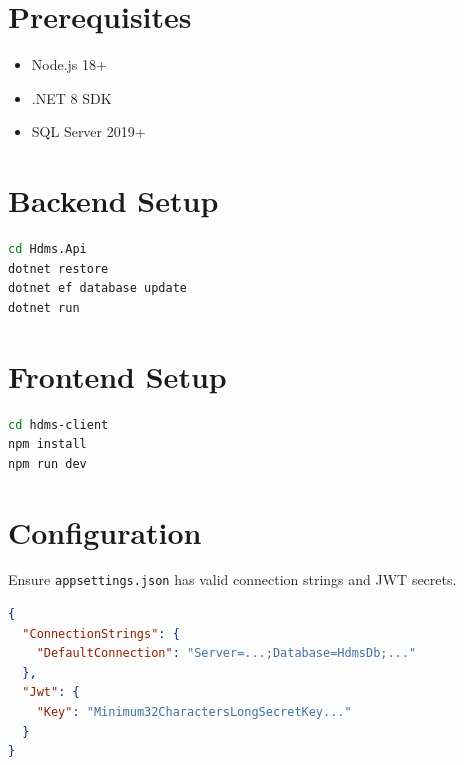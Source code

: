 \documentclass[11pt,a4paper]{report}
\begin{document}
\section{Prerequisites}
\begin{itemize}
    \item Node.js 18+
    \item .NET 8 SDK
    \item SQL Server 2019+
\end{itemize}

\section{Backend Setup}
\begin{lstlisting}[language=bash]
cd Hdms.Api
dotnet restore
dotnet ef database update
dotnet run
\end{lstlisting}

\section{Frontend Setup}
\begin{lstlisting}[language=bash]
cd hdms-client
npm install
npm run dev
\end{lstlisting}

\section{Configuration}
Ensure \texttt{appsettings.json} has valid connection strings and JWT secrets.
\begin{lstlisting}[language=json]
{
  "ConnectionStrings": {
    "DefaultConnection": "Server=...;Database=HdmsDb;..."
  },
  "Jwt": {
    "Key": "Minimum32CharactersLongSecretKey..."
  }
}
\end{lstlisting}
\end{document}

